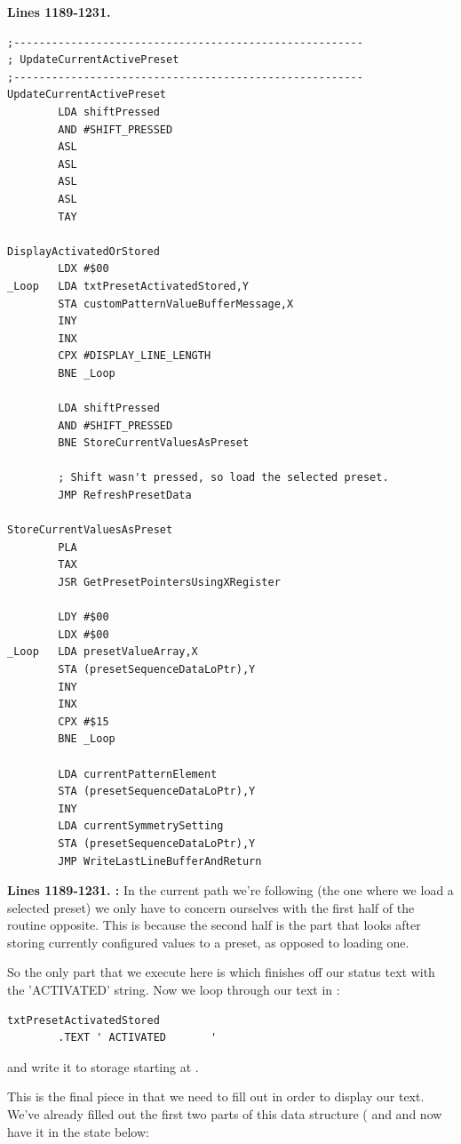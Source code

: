 \clearpage
\textbf{Lines 1189-1231. } 
\begin{lstlisting}
;-------------------------------------------------------
; UpdateCurrentActivePreset
;-------------------------------------------------------
UpdateCurrentActivePreset    
        LDA shiftPressed
        AND #SHIFT_PRESSED
        ASL 
        ASL 
        ASL 
        ASL 
        TAY 

DisplayActivatedOrStored
        LDX #$00
_Loop   LDA txtPresetActivatedStored,Y
        STA customPatternValueBufferMessage,X
        INY 
        INX 
        CPX #DISPLAY_LINE_LENGTH
        BNE _Loop

        LDA shiftPressed
        AND #SHIFT_PRESSED
        BNE StoreCurrentValuesAsPreset

        ; Shift wasn't pressed, so load the selected preset.
        JMP RefreshPresetData

StoreCurrentValuesAsPreset   
        PLA 
        TAX 
        JSR GetPresetPointersUsingXRegister

        LDY #$00
        LDX #$00
_Loop   LDA presetValueArray,X
        STA (presetSequenceDataLoPtr),Y
        INY 
        INX 
        CPX #$15
        BNE _Loop

        LDA currentPatternElement
        STA (presetSequenceDataLoPtr),Y
        INY 
        LDA currentSymmetrySetting
        STA (presetSequenceDataLoPtr),Y
        JMP WriteLastLineBufferAndReturn
\end{lstlisting}
\clearpage

\textbf{Lines 1189-1231. :} In the current path we're following (the one where we load a selected preset)
we only have to concern ourselves with the first half of the routine opposite. This is because the second half is the part that looks after storing
currently configured values to a preset, as opposed to loading one.

So the only part that we execute here is  which finishes off our status text with the 'ACTIVATED' string. Now we loop
through our text in :
\begin{lstlisting}
txtPresetActivatedStored
        .TEXT ' ACTIVATED       '
\end{lstlisting}
and write it to storage starting at . 

This is the final piece in  that we need to fill out
in order to display our text. We've already filled out the first two parts of this data structure ( and  
and now have it in the state below: 

